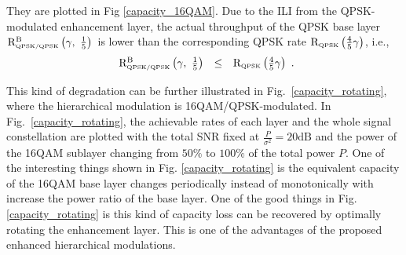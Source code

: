 \documentclass[conference]{IEEEtran}
\begin{document}
\noindent They are plotted in Fig \ref{capacity_16QAM}. Due to the
ILI from the QPSK-modulated enhancement layer, the actual
throughput of the QPSK base layer ${\rm R}_{\mbox{\tiny
QPSK/QPSK}}^{\rm B}\left(\gamma,\ \frac{1}{5} \right)$ is lower
than the corresponding QPSK rate ${\rm R}_{\mbox{\tiny
QPSK}}\left(\frac{4}{5}\gamma\right)$, i.e.,
\begin{equation}
\begin{array}{rcl}
{\rm R}_{\mbox{\tiny QPSK/QPSK}}^{\rm B}\left(\gamma,\ \frac{1}{5}
\right)&\leq&{\rm R}_{\mbox{\tiny QPSK}}
\left(\frac{4}{5}\gamma\right)
\end{array}.\label{R_16QAM_B2}
\end{equation}
\begin{figure}
\end{figure}

This kind of degradation can be further illustrated in
Fig.~\ref{capacity_rotating}, where the hierarchical modulation is
16QAM/QPSK-modulated. In Fig.~\ref{capacity_rotating}, the
achievable rates of each layer and the whole signal constellation
are plotted with the total SNR fixed at
$\frac{P}{\sigma^2}=20\mbox{dB}$ and the power of the 16QAM
sublayer changing from $50\%$ to $100\%$ of the total power $P$.
One of the interesting things shown in Fig.
\ref{capacity_rotating} is the equivalent capacity of the 16QAM
base layer changes periodically instead of monotonically with
increase the power ratio of the base layer. One of the good things
in Fig. \ref{capacity_rotating} is this kind of capacity loss can
be recovered by optimally rotating the enhancement layer. This is
one of the advantages of the proposed enhanced hierarchical
modulations.
\end{document}
